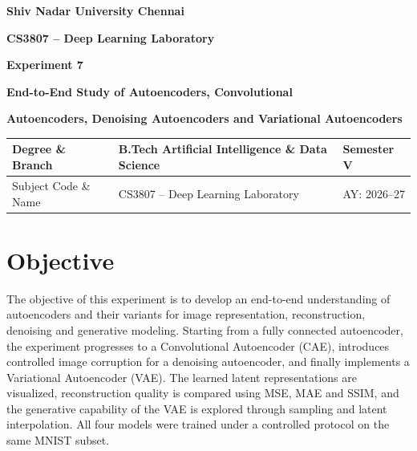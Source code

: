 \documentclass[10pt]{article}
\begin{document}

\begin{center}

{\large\textbf{Shiv Nadar University Chennai}}

\vspace{2mm}

{\normalsize\textbf{CS3807 -- Deep Learning Laboratory}}

\vspace{2mm}

{\large\textbf{Experiment 7}}

\vspace{1mm}

{\normalsize\textbf{End-to-End Study of Autoencoders, Convolutional}}

{\normalsize\textbf{Autoencoders, Denoising Autoencoders and Variational Autoencoders}}

\end{center}

\vspace{3mm}

\begin{tabular}{|p{3.4cm}|p{9.0cm}|p{1.4cm}|}
\hline
Degree \& Branch &
B.Tech Artificial Intelligence \& Data Science &
Semester V\\
\hline
Subject Code \& Name &
CS3807 -- Deep Learning Laboratory &
AY: 2026--27\\
\hline
\end{tabular}

\vspace{4mm}

\section{Objective}

The objective of this experiment is to develop an end-to-end understanding of autoencoders and their
variants for image representation, reconstruction, denoising and generative modeling. Starting from a
fully connected autoencoder, the experiment progresses to a Convolutional Autoencoder (CAE), introduces
controlled image corruption for a denoising autoencoder, and finally implements a Variational Autoencoder
(VAE). The learned latent representations are visualized, reconstruction quality is compared using MSE,
MAE and SSIM, and the generative capability of the VAE is explored through sampling and latent
interpolation. All four models were trained under a controlled protocol on the same MNIST subset.
\end{document}
